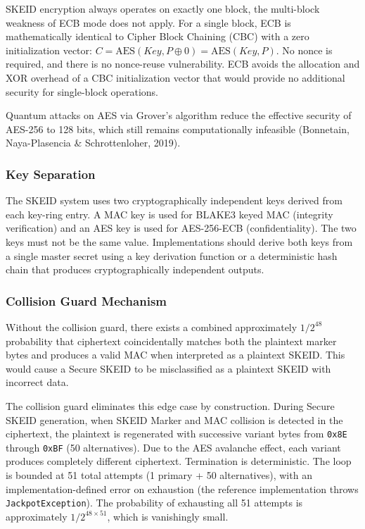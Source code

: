 \documentclass[fleqn,10pt]{wlpeerj}
\begin{document}
SKEID encryption always operates on exactly one block, the multi-block
weakness of ECB mode does not apply. For a single block, ECB is
mathematically identical to Cipher Block Chaining (CBC) with a zero
initialization vector:
\(C = \text{AES}(Key, P \oplus 0) = \text{AES}(Key, P)\). No nonce is
required, and there is no nonce-reuse vulnerability. ECB avoids the
allocation and XOR overhead of a CBC initialization vector that would
provide no additional security for single-block operations.

Quantum attacks on AES via Grover's algorithm reduce the effective
security of AES-256 to 128 bits, which still remains computationally
infeasible (Bonnetain, Naya-Plasencia \& Schrottenloher, 2019).

\subsubsection{Key Separation}\label{key-separation}

The SKEID system uses two cryptographically independent keys derived
from each key-ring entry. A MAC key is used for BLAKE3 keyed MAC
(integrity verification) and an AES key is used for AES-256-ECB
(confidentiality). The two keys must not be the same value.
Implementations should derive both keys from a single master secret
using a key derivation function or a deterministic hash chain that
produces cryptographically independent outputs.

\subsubsection{Collision Guard
Mechanism}\label{collision-guard-mechanism}

Without the collision guard, there exists a combined approximately
\(1/2^{48}\) probability that ciphertext coincidentally matches both the
plaintext marker bytes and produces a valid MAC when interpreted as a
plaintext SKEID. This would cause a Secure SKEID to be misclassified as
a plaintext SKEID with incorrect data.

The collision guard eliminates this edge case by construction. During
Secure SKEID generation, when SKEID Marker and MAC collision is detected
in the ciphertext, the plaintext is regenerated with successive variant
bytes from \texttt{0x8E} through \texttt{0xBF} (50 alternatives). Due to
the AES avalanche effect, each variant produces completely different
ciphertext. Termination is deterministic. The loop is bounded at 51
total attempts (1 primary + 50 alternatives), with an
implementation-defined error on exhaustion (the reference implementation
throws \texttt{JackpotException}). The probability of exhausting all 51
attempts is approximately \(1/2^{48 \times 51}\), which is vanishingly
small.
\end{document}
